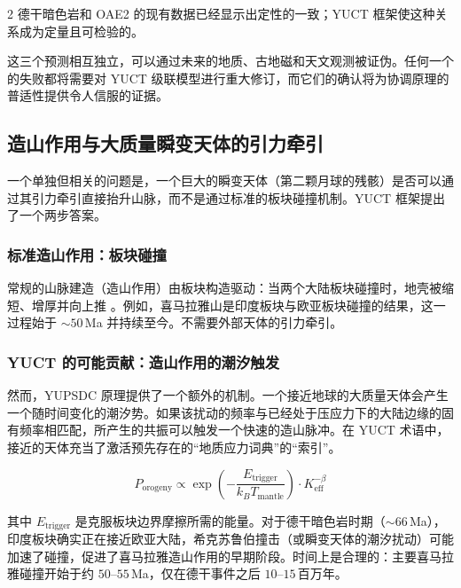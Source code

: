 \documentclass[11pt,a4paper]{article}
\begin{document}
\begin{multicols}{2}
		德干暗色岩和 OAE2 的现有数据已经显示出定性的一致；YUCT 框架使这种关系成为定量且可检验的。
		
		这三个预测相互独立，可以通过未来的地质、古地磁和天文观测被证伪。任何一个的失败都将需要对 YUCT 级联模型进行重大修订，而它们的确认将为协调原理的普适性提供令人信服的证据。
		
		\subsection{造山作用与大质量瞬变天体的引力牵引}
		
		一个单独但相关的问题是，一个巨大的瞬变天体（第二颗月球的残骸）是否可以通过其引力牵引直接抬升山脉，而不是通过标准的板块碰撞机制。YUCT 框架提出了一个两步答案。
		
		\subsubsection{标准造山作用：板块碰撞}
		
		常规的山脉建造（造山作用）由板块构造驱动：当两个大陆板块碰撞时，地壳被缩短、增厚并向上推 \cite{Kearey2013}。例如，喜马拉雅山是印度板块与欧亚板块碰撞的结果，这一过程始于 \(\sim 50\) Ma 并持续至今。不需要外部天体的引力牵引。
		
		\subsubsection{YUCT 的可能贡献：造山作用的潮汐触发}
		
		然而，YUPSDC 原理提供了一个额外的机制。一个接近地球的大质量天体会产生一个随时间变化的潮汐势。如果该扰动的频率与已经处于压应力下的大陆边缘的固有频率相匹配，所产生的共振可以触发一个快速的造山脉冲。在 YUCT 术语中，接近的天体充当了激活预先存在的“地质应力词典”的“索引”。
		
		\begin{equation}
			P_{\text{orogeny}} \propto \exp\left(-\frac{E_{\text{trigger}}}{k_B T_{\text{mantle}}}\right) \cdot K_{\mathrm{eff}}^{-\beta}
		\end{equation}
		
		其中 \(E_{\text{trigger}}\) 是克服板块边界摩擦所需的能量。对于德干暗色岩时期（\(\sim 66\) Ma），印度板块确实正在接近欧亚大陆，希克苏鲁伯撞击（或瞬变天体的潮汐扰动）可能加速了碰撞，促进了喜马拉雅造山作用的早期阶段。时间上是合理的：主要喜马拉雅碰撞开始于约 \(50\)–\(55\) Ma，仅在德干事件之后 \(10\)–\(15\) 百万年。
		

\end{multicols}
\end{document}
